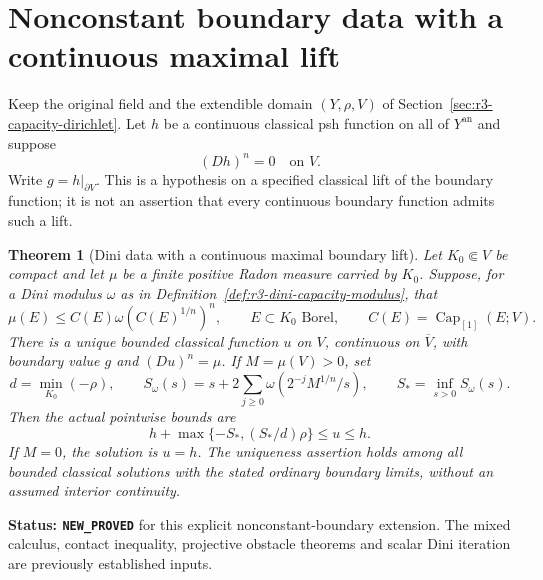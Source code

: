 \documentclass[11pt,a4paper]{article}
\numberwithin{equation}{section}
\newtheorem{theorem}{Theorem}[section]
\theoremstyle{definition}
\theoremstyle{remark}
\newcommand{\an}{\mathrm{an}}
\begin{document}
\section{Nonconstant boundary data with a continuous maximal lift}
\label{sec:r3-maximal-boundary-dirichlet}

Keep the original field and the extendible domain $(Y,\rho,V)$
of Section~\ref{sec:r3-capacity-dirichlet}. Let $h$ be a continuous
classical psh function on all of $Y^{\an}$ and suppose
\[
 (Dh)^n=0\quad\text{on }V.
\]
Write $g=h|_{\partial V}$. This is a hypothesis on a specified
classical lift of the boundary function; it is not an assertion
that every continuous boundary function admits such a lift.

\begin{theorem}[Dini data with a continuous maximal boundary lift]
\label{thm:r3-maximal-boundary-dirichlet}
Let $K_0\Subset V$ be compact and let $\mu$ be a finite positive
Radon measure carried by $K_0$. Suppose, for a Dini modulus
$\omega$ as in Definition~\ref{def:r3-dini-capacity-modulus}, that
\[
 \mu(E)\leq C(E)\omega(C(E)^{1/n})^n,
 \qquad E\subset K_0\text{ Borel},\qquad
 C(E)=\operatorname{Cap}_{[1]}(E;V).
\]
There is a unique bounded classical function $u$ on $V$,
continuous on $\overline V$, with boundary value $g$ and
$(Du)^n=\mu$. If $M=\mu(V)>0$, set
\[
 d=\min_{K_0}(-\rho),\qquad
 S_\omega(s)=s+2\sum_{j\geq0}\omega(2^{-j}M^{1/n}/s),
 \qquad S_* =\inf_{s>0}S_\omega(s).
\]
Then the actual pointwise bounds are
\[
 h+\max\{-S_*,(S_*/d)\rho\}\leq u\leq h.
\]
If $M=0$, the solution is $u=h$. The uniqueness assertion holds
among all bounded classical solutions with the stated ordinary
boundary limits, without an assumed interior continuity.
\end{theorem}

\noindent\textbf{Status: \texttt{NEW\_PROVED}} for this explicit
nonconstant-boundary extension. The mixed calculus, contact
inequality, projective obstacle theorems and scalar Dini iteration
are previously established inputs.
\end{document}
